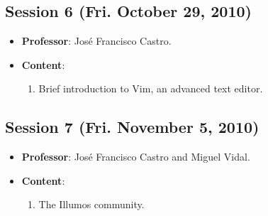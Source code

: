 \documentclass[a4paper]{article}
\begin{document}
\subsection{Session 6 (Fri. October 29, 2010)}

\begin{itemize}
 \item \textbf{Professor}: José Francisco Castro.

 \item \textbf{Content}:

 \begin{enumerate}
  \item Brief introduction to Vim, an advanced text editor.
 \end{enumerate}

\end{itemize}

\subsection{Session 7 (Fri. November 5, 2010)}

\begin{itemize}
 \item \textbf{Professor}: José Francisco Castro and Miguel Vidal.

 \item \textbf{Content}:

 \begin{enumerate}
  \item The Illumos community.
 \end{enumerate}

\end{itemize}
\end{document}
